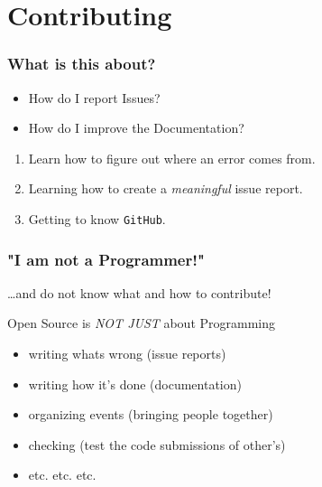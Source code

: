 \section{Contributing}
{   
}

\begin{frame}
	\frametitle{What is this about?}
	\begin{question}[Questions]
		\begin{itemize}
			\item How do I report Issues?
			\item How do I improve the Documentation?
		\end{itemize}
	\end{question}
	\begin{docs}[Objectives]
		\begin{enumerate}
			\item Learn how to figure out where an error comes from.
			\item Learning how to create a \emph{meaningful} issue report.
			\item Getting to know \texttt{GitHub}.
		\end{enumerate}
	\end{docs}
\end{frame}

\begin{frame}
  \frametitle{"I am not a Programmer!"}
  \ldots and do not know what and how to contribute!
  \pause
  \begin{block}{Open Source is \emph{NOT JUST} about Programming}
  	\begin{itemize}[<+->]
  		\item writing whats wrong (issue reports)
  		\item writing how it's done (documentation)
  		\item organizing events (bringing people together)
  		\item checking (test the code submissions of other's)
  		\item etc. etc. etc.
  	\end{itemize}
  \end{block} 
\end{frame}

